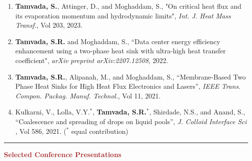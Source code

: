 \documentclass[11pt, letterpaper]{article}
\begin{document}
\begin{enumerate}[leftmargin=*]
\setlength\itemsep{-1pt}
\vspace{-8pt}
\item \textbf{Tamvada, S.}, Attinger, D., and Moghaddam, S., "On critical heat flux and its evaporation momentum and hydrodynamic limits", \textit{Int. J. Heat Mass Transf.}, Vol 203, 2023.
\item \textbf{Tamvada, S.R.} and Moghaddam, S., ``Data center energy efficiency enhancement using a two-phase heat sink with ultra-high heat transfer coefficient", \textit{arXiv preprint arXiv:2207.12508}, 2022.
\item \textbf{Tamvada, S.R.}, Alipanah, M., and Moghaddam, S., ``Membrane-Based Two Phase Heat Sinks for High Heat Flux Electronics and Lasers'', \textit{IEEE Trans. Compon. Packag. Manuf. Technol.}, Vol 11, 2021.
\item Kulkarni, V., Lolla, V.Y.$^\ast$, \textbf{Tamvada, S.R.}$^\ast$, Shirdade, N.S., and Anand, S., ``Coalescence and spreading of drops on liquid pools'', \textit{J. Colloid Interface Sci }, Vol 586, 2021. ($^\ast$ equal contribution)
\end{enumerate}
\vspace{-10pt}
\noindent \rule[2pt]{\textwidth}{0.5pt}
\noindent \textbf{\large \textcolor{Brown}{Selected Conference Presentations}}\\
\end{document}
